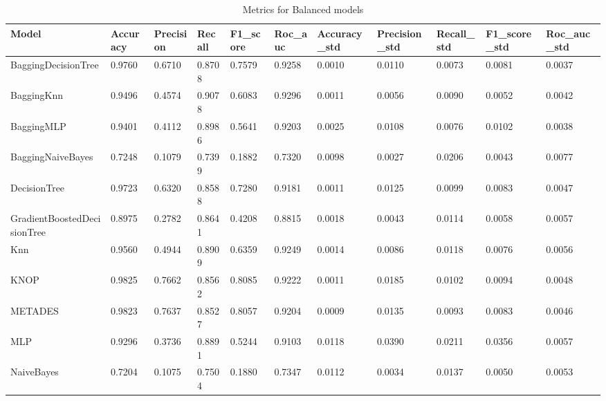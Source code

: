 
\begin{table}[h!]
    \centering
    \caption{Metrics for Balanced models}
    \label{tab:Balanced_metrics}
    \begin{tabular}{l|l|l|l|l|l|l|l|l|l|l}
\toprule
                      Model &  Accuracy &  Precision &  Recall &  F1\_score &  Roc\_auc &  Accuracy\_std &  Precision\_std &  Recall\_std &  F1\_score\_std &  Roc\_auc\_std \\
\midrule
        BaggingDecisionTree &    0.9760 &     0.6710 &  0.8708 &    0.7579 &   0.9258 &        0.0010 &         0.0110 &      0.0073 &        0.0081 &       0.0037 \\
                 BaggingKnn &    0.9496 &     0.4574 &  0.9078 &    0.6083 &   0.9296 &        0.0011 &         0.0056 &      0.0090 &        0.0052 &       0.0042 \\
                 BaggingMLP &    0.9401 &     0.4112 &  0.8986 &    0.5641 &   0.9203 &        0.0025 &         0.0108 &      0.0076 &        0.0102 &       0.0038 \\
          BaggingNaiveBayes &    0.7248 &     0.1079 &  0.7399 &    0.1882 &   0.7320 &        0.0098 &         0.0027 &      0.0206 &        0.0043 &       0.0077 \\
               DecisionTree &    0.9723 &     0.6320 &  0.8588 &    0.7280 &   0.9181 &        0.0011 &         0.0125 &      0.0099 &        0.0083 &       0.0047 \\
GradientBoostedDecisionTree &    0.8975 &     0.2782 &  0.8641 &    0.4208 &   0.8815 &        0.0018 &         0.0043 &      0.0114 &        0.0058 &       0.0057 \\
                        Knn &    0.9560 &     0.4944 &  0.8909 &    0.6359 &   0.9249 &        0.0014 &         0.0086 &      0.0118 &        0.0076 &       0.0056 \\
                       KNOP &    0.9825 &     0.7662 &  0.8562 &    0.8085 &   0.9222 &        0.0011 &         0.0185 &      0.0102 &        0.0094 &       0.0048 \\
                    METADES &    0.9823 &     0.7637 &  0.8527 &    0.8057 &   0.9204 &        0.0009 &         0.0135 &      0.0093 &        0.0083 &       0.0046 \\
                        MLP &    0.9296 &     0.3736 &  0.8891 &    0.5244 &   0.9103 &        0.0118 &         0.0390 &      0.0211 &        0.0356 &       0.0057 \\
                 NaiveBayes &    0.7204 &     0.1075 &  0.7504 &    0.1880 &   0.7347 &        0.0112 &         0.0034 &      0.0137 &        0.0050 &       0.0053 \\

\end{tabular}
\end{table}
